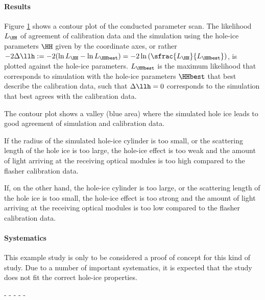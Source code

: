 \paragraph{Results}
Figure \ref{fig:ut4nao7X} shows a contour plot of the conducted parameter scan. The likelihood $L_\HH$ of agreement of calibration data and the simulation using the hole-ice parameters $\HH$ given by the coordinate axes, or rather $-2\Delta\llh:= -2(\ln L_\HH - \ln L_\HHbest) = -2 \ln \left(\sfrac{L_\HH}{L_\HHbest}\right)$, is plotted against the hole-ice parameters. $L_\HHbest$ is the maximum likelihood that corresponds to simulation with the hole-ice parameters $\HHbest$ that best describe the calibration data, such that $\Delta\llh = 0$ corresponds to the simulation that best agrees with the calibration data.

\begin{figure}[htbp]
  \caption{\todo{}}
  \label{fig:ut4nao7X}
\end{figure}

The contour plot shows a valley (blue area) where the simulated hole ice leads to good agreement of simulation and calibration data.

If the radius of the simulated hole-ice cylinder is too small, or the scattering length of the hole ice is too large, the hole-ice effect is too weak and the amount of light arriving at the receiving optical modules is too high compared to the flasher calibration data.

If, on the other hand, the hole-ice cylinder is too large, or the scattering length of the hole ice is too small, the hole-ice effect is too strong and the amount of light arriving at the receiving optical modules is too low compared to the flasher calibration data.


\paragraph{Systematics}
This example study is only to be considered a proof of concept for this kind of study. Due to a number of important systematics, it is expected that the study does not fit the correct hole-ice properties.

- 
- 
- 
- 
- 
